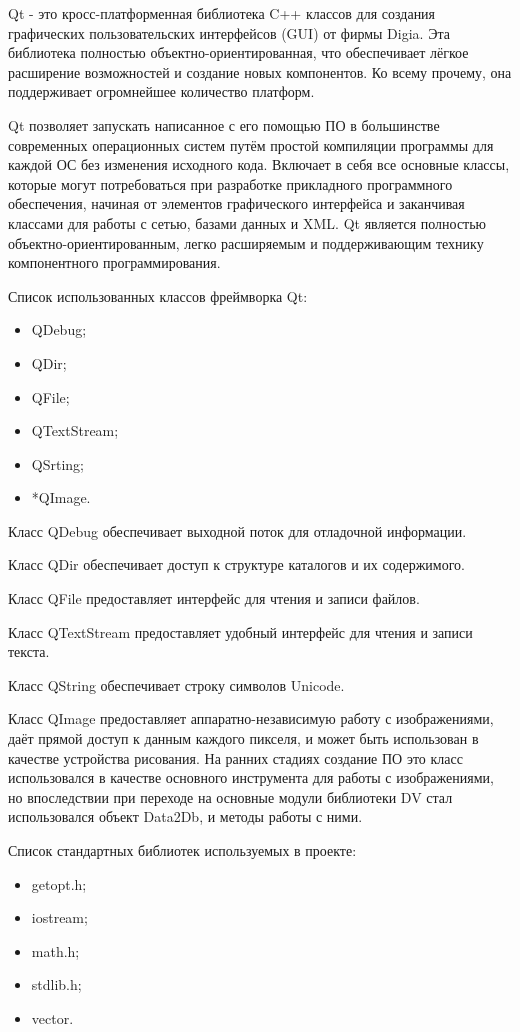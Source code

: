 Qt - это кросс-платформенная библиотека C++ классов для создания графических пользовательских интерфейсов (GUI) от фирмы Digia. Эта библиотека полностью объектно-ориентированная, что обеспечивает лёгкое расширение возможностей и создание новых компонентов. Ко всему прочему, она поддерживает огромнейшее количество платформ.

Qt позволяет запускать написанное с его помощью ПО в большинстве современных операционных систем путём простой компиляции программы для каждой ОС без изменения исходного кода. Включает в себя все основные классы, которые могут потребоваться при разработке прикладного программного обеспечения, начиная от элементов графического интерфейса и заканчивая классами для работы с сетью, базами данных и XML. Qt является полностью объектно-ориентированным, легко расширяемым и поддерживающим технику компонентного программирования.

Список использованных классов фреймворка Qt:
\begin{itemize}
\item QDebug;
\item QDir;
\item QFile;
\item QTextStream;
\item QSrting;
\item *QImage.
\end{itemize}

Класс QDebug обеспечивает выходной поток для отладочной информации.

Класс QDir обеспечивает доступ к структуре каталогов и их содержимого.

Класс QFile предоставляет интерфейс для чтения и записи файлов.

Класс QTextStream предоставляет удобный интерфейс для чтения и записи текста.

Класс QString обеспечивает строку символов Unicode.

Класс QImage предоставляет аппаратно-независимую работу с изображениями, даёт прямой доступ к данным каждого пикселя, и может быть использован в качестве устройства рисования. На ранних стадиях создание ПО это класс использовался в качестве основного инструмента для работы с изображениями, но впоследствии при переходе на основные модули библиотеки DV стал использовался объект Data2Db, и методы работы с ними.

Список стандартных библиотек используемых в проекте:

\begin{itemize}
\item getopt.h;
\item iostream;
\item math.h;
\item stdlib.h;
\item vector.
\end{itemize}

